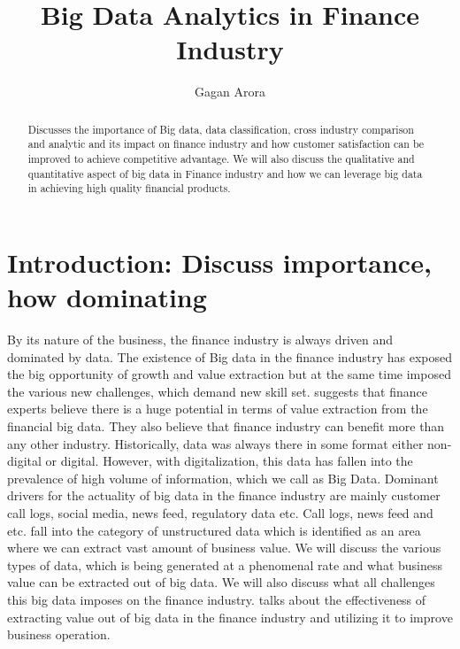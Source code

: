 \documentclass[sigconf]{acmart}
\begin{document}
\title{Big Data Analytics in Finance Industry}


\author{Gagan Arora}


\renewcommand{\shortauthors}{B. Trovato et al.}


\begin{abstract}
Discusses the importance of Big data, data classification, cross industry comparison and analytic and its impact on finance industry and how customer satisfaction can be improved to achieve competitive advantage.
We will also discuss the qualitative and quantitative aspect of big data in Finance industry and how we can leverage big data in achieving high quality financial products. 
\end{abstract}



\maketitle

\section{Introduction: Discuss importance, how dominating }

By its nature of the business, the finance industry is always driven and dominated by data. The existence of Big data in the finance industry has exposed the big opportunity of growth and value extraction but at the same time imposed the various new challenges, which demand new skill set. \cite{Ref3} suggests that finance experts believe there is a huge potential in terms of value extraction from the financial big data. They also believe that finance industry can benefit more than any other industry.  Historically, data was always there in some format either non-digital or digital. However, with digitalization, this data has fallen into the prevalence of high volume of information, which we call as Big Data. Dominant drivers for the actuality of big data in the finance industry are mainly customer call logs, social media, news feed, regulatory data etc. Call logs, news feed and etc. fall into the category of unstructured data which is identified as an area where we can extract vast amount of business value. We will discuss the various types of data, which is being generated at a phenomenal rate and what business value can be extracted out of big data. We will also discuss what all challenges this big data imposes on the finance industry. \cite{Ref1} talks about the effectiveness of extracting value out of big data in the finance industry and utilizing it to improve business operation. 
\end{document}
